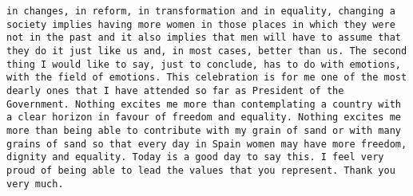 \documentclass[
]{article}
\begin{document}
\begin{verbatim}
in changes, in reform, in transformation and in equality, changing a society implies having more women in those places in which they were not in the past and it also implies that men will have to assume that they do it just like us and, in most cases, better than us. The second thing I would like to say, just to conclude, has to do with emotions, with the field of emotions. This celebration is for me one of the most dearly ones that I have attended so far as President of the Government. Nothing excites me more than contemplating a country with a clear horizon in favour of freedom and equality. Nothing excites me more than being able to contribute with my grain of sand or with many grains of sand so that every day in Spain women may have more freedom, dignity and equality. Today is a good day to say this. I feel very proud of being able to lead the values that you represent. Thank you very much.

\end{verbatim}
\end{document}
